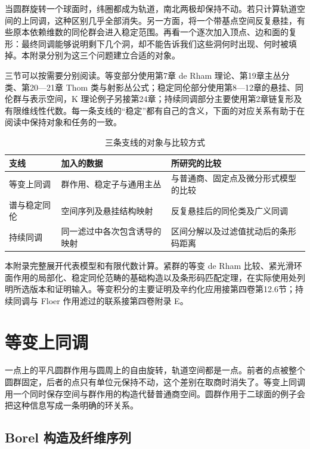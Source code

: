 当圆群旋转一个球面时，纬圈都成为轨道，南北两极却保持不动。若只计算轨道空间的上同调，这种区别几乎全部消失。另一方面，将一个带基点空间反复悬挂，有些原本依赖维数的同伦群会进入稳定范围。再看一个逐次加入顶点、边和面的复形：最终同调能够说明剩下几个洞，却不能告诉我们这些洞何时出现、何时被填掉。本附录分别为这三个问题建立合适的对象。

\ProseParagraphBreak

三节可以按需要分别阅读。等变部分使用第7章 de Rham 理论、第19章主丛分类、第20—21章 Thom 类与射影丛公式；稳定同伦部分使用第8—12章的悬挂、同伦群与表示空间，K 理论例子另接第24章；持续同调部分主要使用第2章链复形及有限维线性代数。每一条支线的“稳定”都有自己的含义，下面的对应关系有助于在阅读中保持对象和任务的一致。

\begin{table}[htbp]
	\centering
	\caption{三条支线的对象与比较方式}
	\label{g2:tab:appendix-c-three-directions}
	\begin{tabularx}{\textwidth}{@{}lXX@{}}
		\toprule
		支线 & 加入的数据 & 所研究的比较 \\
		\midrule
		等变上同调 & 群作用、稳定子与通用主丛 & 与普通商、固定点及微分形式模型的比较 \\
		谱与稳定同伦 & 空间序列及悬挂结构映射 & 反复悬挂后的同伦类及广义同调 \\
		持续同调 & 同一滤过中各次包含诱导的映射 & 区间分解以及过滤值扰动后的条形码距离 \\
		\bottomrule
	\end{tabularx}
\end{table}

本附录完整展开代表模型和有限代数计算。紧群的等变 de Rham 比较、紧光滑环面作用的局部化、稳定同伦范畴的基础构造以及条形码匹配定理，在实际使用处列明所选版本和证明输入。等变积分的主要证明及辛约化应用接第四卷第12.6节；持续同调与 Floer 作用滤过的联系接第四卷附录 E。

\section{等变上同调}
\label{g2:sec:C01}

一点上的平凡圆群作用与圆周上的自由旋转，轨道空间都是一点。前者的点被整个圆群固定，后者的点只有单位元保持不动，这个差别在取商时消失了。等变上同调用一个同时保存空间与群作用的构造代替普通商空间。圆群作用于二球面的例子会把这种信息写成一条明确的环关系。

\subsection{Borel 构造及纤维序列}
\label{g2:subsec:C01:01}


